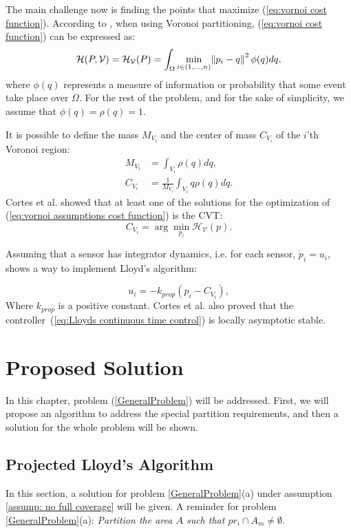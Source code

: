 \documentclass{iacas}
\begin{document}
The main challenge now is finding the points that maximize (\ref{eq:vornoi cost function}). According to \cite{Cortes2004}, when using Voronoi partitioning, (\ref{eq:vornoi cost function}) can be expressed as:
\begin{equation}
\mathcal{H}(P, \mathcal{V}) = \mathcal{H}_{\mathcal{V}}(P) = \int_{\Omega} \min_{i \in (1,\ldots, n)} \norm{p_i-q}^2 \phi(q) dq,
\label{eq:vornoi assumptions cost function}
\end{equation}
where $\phi(q)$ represents a measure of information or probability that some event take place over $\Omega$. For the rest of the problem, and for the sake of simplicity, we assume that $\phi(q) = \rho(q) = 1$.

It is possible to define the mass $M_{V_i}$ and the center of mass $C_{V_i}$ of the $i$'th Voronoi region:
\begin{align*}
M_{V_i} &= \int_{V_i} \rho(q)dq, \\
C_{V_i} &= \frac{1}{M_{V_i}} \int_{V_i} q\rho(q)dq.
\end{align*}
Cortes et al. \cite{Cortes2004} showed that at least one of the solutions for the optimization of (\ref{eq:vornoi assumptions cost function}) is the CVT:
\begin{equation}
C_{V_i} = \arg\min_{p_i} \mathcal{H}_{\mathcal{V}}(p).
\end{equation}

Assuming that a sensor has integrator dynamics, i.e. for each sensor, $\dot{p}_i = u_i$, \cite{Cortes2004} shows a way to implement Lloyd's algorithm:

\begin{equation} \label{eq:Lloyds continuous time control}
u_{i} = -k_{prop}\left( p_i - C_{V_{i}} \right),
\end{equation} 
Where $k_{prop}$ is a positive constant. Cortes et al. \cite{Cortes2004} also proved that the controller~(\ref{eq:Lloyds continuous time control}) is locally asymptotic stable.


\section{Proposed Solution}

In this chapter, problem (\ref{GeneralProblem}) will be addressed. First, we will propose an algorithm to address the special partition requirements, and then a solution for the whole problem will be shown.

\subsection{Projected Lloyd's Algorithm}
In this section, a solution for problem \ref{GeneralProblem}(a) under assumption \ref{assump: no full coverage} will be given. A reminder for problem \ref{GeneralProblem}(a): 
\emph{Partition the area $A$ such that $pr_i \cap A_m \neq \emptyset$}.
\end{document}

